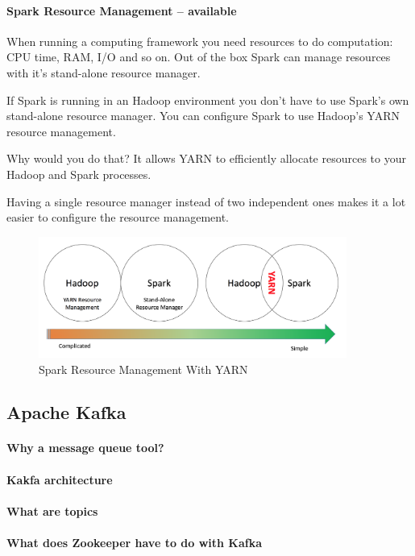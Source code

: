 \documentclass[12pt]{scrartcl} %
\begin{document}
\paragraph{Spark Resource Management -- available}
When running a computing framework you need resources to do computation: CPU time, RAM, I/O and so on. Out of the box Spark can manage resources with it’s stand-alone resource manager.

If Spark is running in an Hadoop environment you don’t have to use Spark’s own stand-alone resource manager. You can configure Spark to use Hadoop’s YARN resource management.

Why would you do that?
It allows YARN to efficiently allocate resources to your Hadoop and Spark processes.

Having a single resource manager instead of two independent ones makes it a lot easier to configure the resource management.

\begin{figure}[htbp]
  \centering
     \includegraphics[width=0.9\textwidth]{images/Spark-Yarn}
  \caption{Spark Resource Management With YARN}
  \label{fig:Bild1}
\end{figure}


\subsection{Apache Kafka}

\paragraph{Why a message queue tool?}
\paragraph{Kakfa architecture}
\paragraph{What are topics}
\paragraph{What does Zookeeper have to do with Kafka}
\end{document}
